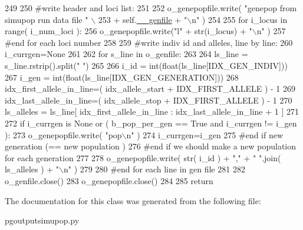 \begin{DoxyCode}
249 
250         \textcolor{comment}{#write header and loci list:}
251 
252         o\_genepopfile.write( \textcolor{stringliteral}{"genepop from simupop run data file "} \(\backslash\)
253                 + self.\hyperlink{classnegui_1_1pgoutputsimupop_1_1PGOutputSimuPop_a30fb6b94af13efad6becfbe6fddc1d95}{\_\_genfile} + \textcolor{stringliteral}{"\(\backslash\)n"} )
254 
255         \textcolor{keywordflow}{for} i\_locus \textcolor{keywordflow}{in} range( i\_num\_loci ):
256             o\_genepopfile.write(\textcolor{stringliteral}{"l"} + str(i\_locus) + \textcolor{stringliteral}{"\(\backslash\)n"} )
257         \textcolor{comment}{#end for each loci number}
258 
259         \textcolor{comment}{#write indiv id and alleles, line by line:}
260         i\_currgen=\textcolor{keywordtype}{None}
261 
262         \textcolor{keywordflow}{for} s\_line \textcolor{keywordflow}{in} o\_genfile:
263             
264             ls\_line = s\_line.rstrip().split(\textcolor{stringliteral}{" "})
265 
266             i\_id = int(float(ls\_line[IDX\_GEN\_INDIV]))
267             i\_gen = int(float(ls\_line[IDX\_GEN\_GENERATION]))
268             idx\_first\_allele\_in\_line=( idx\_allele\_start + IDX\_FIRST\_ALLELE ) - 1
269             idx\_last\_allele\_in\_line=( idx\_allele\_stop  + IDX\_FIRST\_ALLELE ) - 1 
270             ls\_alleles = ls\_line[ idx\_first\_allele\_in\_line : idx\_last\_allele\_in\_line + 1 ]
271 
272             \textcolor{keywordflow}{if} i\_currgen \textcolor{keywordflow}{is} \textcolor{keywordtype}{None} \textcolor{keywordflow}{or} ( b\_pop\_per\_gen == \textcolor{keyword}{True} \textcolor{keywordflow}{and} i\_currgen != i\_gen ):
273                     o\_genepopfile.write( \textcolor{stringliteral}{"pop\(\backslash\)n"} )
274                     i\_currgen=i\_gen
275                 \textcolor{comment}{#end if new generation (== new population )}
276                 \textcolor{comment}{#end if we should make a new population for each generation}
277 
278             o\_genepopfile.write( str( i\_id ) + \textcolor{stringliteral}{","} +  \textcolor{stringliteral}{" "}.join( ls\_alleles ) + \textcolor{stringliteral}{"\(\backslash\)n"}  )
279 
280         \textcolor{comment}{#end for each line in gen file}
281 
282         o\_genfile.close()
283         o\_genepopfile.close()
284 
285         \textcolor{keywordflow}{return}
\end{DoxyCode}


The documentation for this class was generated from the following file\+:\begin{DoxyCompactItemize}
\item 
pgoutputsimupop.\+py\end{DoxyCompactItemize}
